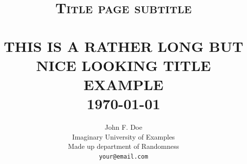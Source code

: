 \documentclass{scrartcl}
\begin{document}
\makeatletter							%
\def\printtitle{%
    {\centering \@title\par}}
\makeatother									

\makeatletter							%
\def\printauthor{%
    {\centering \large \@author}}				
\makeatother							

\title{	\normalsize \textsc{Title page subtitle} 	%
		 	\\[2.0cm]								%
			\HRule{0.5pt} \\						%
			\LARGE \textbf{\uppercase{This is a rather long but nice looking title example}}	%
			\HRule{2pt} \\ [0.5cm]		%
			\normalsize \today			%
		}

\author{
		John F. Doe\\	
		Imaginary University of Examples\\	
		Made up department of Randomness\\
        \texttt{your@email.com} \\
}
\end{document}
